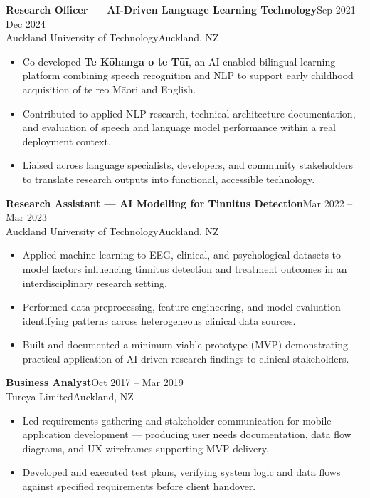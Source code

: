 \documentclass[10.5pt,a4paper]{article}
\newenvironment{expbox}{%
  \begin{tcolorbox}[
    blanker, breakable,
    left=10pt,
    borderline west={2.5pt}{0pt}{accentlt},
    before upper={\parskip=2pt},
    top=0pt, bottom=0pt
  ]
}{%
  \end{tcolorbox}\vspace{4pt}
}
\newcommand{\role}[4]{%
  {\bfseries #1}\hfill{\small\color{accent}#2}\\[-1pt]
  {\small\color{mid}#3}\hfill{\small\color{light}#4}\\[3pt]%
}
\begin{document}
\begin{expbox}
\role{Research Officer — AI-Driven Language Learning Technology}
     {Sep 2021 – Dec 2024}
     {Auckland University of Technology}
     {Auckland, NZ}
\begin{itemize}
  \item Co-developed \textbf{Te Kōhanga o te Tūī}, an AI-enabled bilingual learning platform
        combining speech recognition and NLP to support early childhood acquisition of
        te reo Māori and English.
  \item Contributed to applied NLP research, technical architecture documentation, and
        evaluation of speech and language model performance within a real deployment context.
  \item Liaised across language specialists, developers, and community stakeholders to
        translate research outputs into functional, accessible technology.
\end{itemize}
\end{expbox}

\begin{expbox}
\role{Research Assistant — AI Modelling for Tinnitus Detection}
     {Mar 2022 – Mar 2023}
     {Auckland University of Technology}
     {Auckland, NZ}
\begin{itemize}
  \item Applied machine learning to EEG, clinical, and psychological datasets to model
        factors influencing tinnitus detection and treatment outcomes in an interdisciplinary
        research setting.
  \item Performed data preprocessing, feature engineering, and model evaluation —
        identifying patterns across heterogeneous clinical data sources.
  \item Built and documented a minimum viable prototype (MVP) demonstrating practical
        application of AI-driven research findings to clinical stakeholders.
\end{itemize}
\end{expbox}

\begin{expbox}
\role{Business Analyst}
     {Oct 2017 – Mar 2019}
     {Tureya Limited}
     {Auckland, NZ}
\begin{itemize}
  \item Led requirements gathering and stakeholder communication for mobile application
        development — producing user needs documentation, data flow diagrams, and UX
        wireframes supporting MVP delivery.
  \item Developed and executed test plans, verifying system logic and data flows against
        specified requirements before client handover.
\end{itemize}
\end{expbox}
\end{document}
